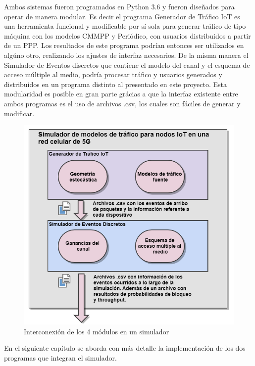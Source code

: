 Ambos sistemas fueron programados en Python 3.6 y fueron diseñados para operar  de manera modular. Es decir el programa Generador de Tráfico IoT es una herramienta funcional y modificable por sí sola para generar tráfico de tipo máquina con los modelos CMMPP y Periódico, con usuarios distribuidos a partir de un PPP. Los resultados de este programa podrían entonces ser utilizados en algúno otro, realizando los ajustes de interfaz necesarios. De la misma manera el Simulador de Eventos discretos que contiene el modelo del canal y el esquema de acceso múltiple al medio, podría procesar tráfico y usuarios generados y distribuidos en un programa distinto al presentado en este proyecto. Esta modularidad es posible en gran parte grácias a que la interfaz existente entre ambos programas es el uso de archivos .csv, los cuales son fáciles de generar y modificar.\newline

\begin{figure}[th]
    \centering
    \includegraphics[scale=.74]{Figures/interconexion4modulos.png}
    \decoRule
    \caption[Interconexión de los 4 módulos en un simulador]{Interconexión de los 4 módulos en un simulador}
    \label{fig:interconexion4}
\end{figure}

En el siguiente capítulo se aborda con más detalle la implementación de los dos programas que integran el simulador. \newline


